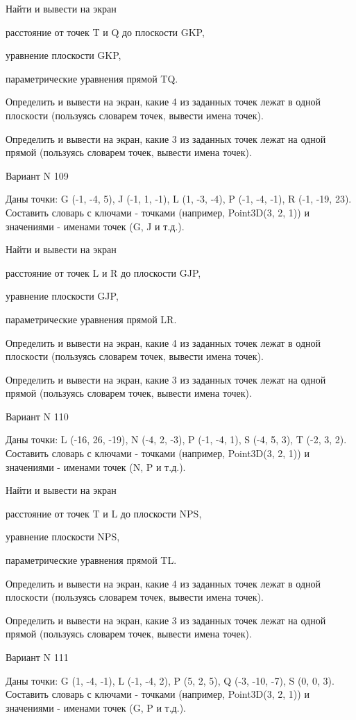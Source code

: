 \documentclass[11pt]{report}
\begin{document}
Найти и вывести на экран


расстояние от точек T и Q до плоскости GKP,


уравнение плоскости GKP,


параметрические уравнения прямой TQ.


Определить и вывести на экран, какие 4 из заданных точек лежат в одной плоскости (пользуясь словарем точек, вывести имена точек).


Определить и вывести на экран, какие 3 из заданных точек лежат на одной прямой (пользуясь словарем точек, вывести имена точек).

\newpage
Вариант N 109

Даны точки: G (-1, -4, 5), J (-1, 1, -1), L (1, -3, -4), P (-1, -4, -1), R (-1, -19, 23).
Составить словарь с ключами - точками (например, Point3D(3, 2, 1)) и значениями - именами точек (G, J и т.д.).


Найти и вывести на экран


расстояние от точек L и R до плоскости GJP,


уравнение плоскости GJP,


параметрические уравнения прямой LR.


Определить и вывести на экран, какие 4 из заданных точек лежат в одной плоскости (пользуясь словарем точек, вывести имена точек).


Определить и вывести на экран, какие 3 из заданных точек лежат на одной прямой (пользуясь словарем точек, вывести имена точек).

\newpage
Вариант N 110

Даны точки: L (-16, 26, -19), N (-4, 2, -3), P (-1, -4, 1), S (-4, 5, 3), T (-2, 3, 2).
Составить словарь с ключами - точками (например, Point3D(3, 2, 1)) и значениями - именами точек (N, P и т.д.).


Найти и вывести на экран


расстояние от точек T и L до плоскости NPS,


уравнение плоскости NPS,


параметрические уравнения прямой TL.


Определить и вывести на экран, какие 4 из заданных точек лежат в одной плоскости (пользуясь словарем точек, вывести имена точек).


Определить и вывести на экран, какие 3 из заданных точек лежат на одной прямой (пользуясь словарем точек, вывести имена точек).

\newpage
Вариант N 111

Даны точки: G (1, -4, -1), L (-1, -4, 2), P (5, 2, 5), Q (-3, -10, -7), S (0, 0, 3).
Составить словарь с ключами - точками (например, Point3D(3, 2, 1)) и значениями - именами точек (G, P и т.д.).
\end{document}
